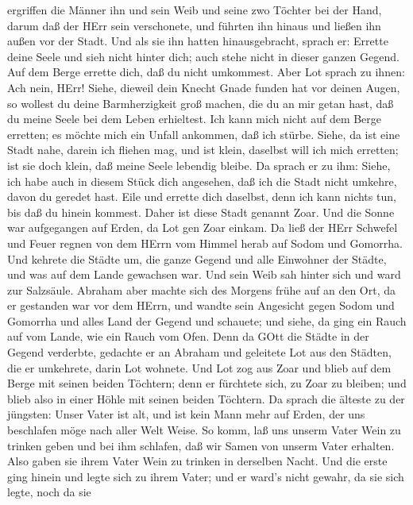 ergriffen die Männer ihn und sein Weib und seine zwo Töchter bei der
Hand, darum daß der HErr sein verschonete, und führten ihn hinaus und
ließen ihn außen vor der Stadt.  Und als sie ihn hatten
hinausgebracht, sprach er: Errette deine Seele und sieh nicht hinter
dich; auch stehe nicht in dieser ganzen Gegend. Auf dem Berge errette
dich, daß du nicht umkommest.  Aber Lot sprach zu ihnen:
Ach nein, HErr!  Siehe, dieweil dein Knecht Gnade funden
hat vor deinen Augen, so wollest du deine Barmherzigkeit groß machen,
die du an mir getan hast, daß du meine Seele bei dem Leben erhieltest.
Ich kann mich nicht auf dem Berge erretten; es möchte mich ein Unfall
ankommen, daß ich stürbe.  Siehe, da ist eine Stadt nahe,
darein ich fliehen mag, und ist klein, daselbst will ich mich erretten;
ist sie doch klein, daß meine Seele lebendig bleibe.  Da
sprach er zu ihm: Siehe, ich habe auch in diesem Stück dich angesehen,
daß ich die Stadt nicht umkehre, davon du geredet hast. 
Eile und errette dich daselbst, denn ich kann nichts tun, bis daß du
hinein kommest. Daher ist diese Stadt genannt Zoar.  Und
die Sonne war aufgegangen auf Erden, da Lot gen Zoar einkam.
 Da ließ der HErr Schwefel und Feuer regnen von dem HErrn
vom Himmel herab auf Sodom und Gomorrha.  Und kehrete die
Städte um, die ganze Gegend und alle Einwohner der Städte, und was auf
dem Lande gewachsen war.  Und sein Weib sah hinter sich und
ward zur Salzsäule.  Abraham aber machte sich des Morgens
frühe auf an den Ort, da er gestanden war vor dem HErrn, 
und wandte sein Angesicht gegen Sodom und Gomorrha und alles Land der
Gegend und schauete; und siehe, da ging ein Rauch auf vom Lande, wie ein
Rauch vom Ofen.  Denn da GOtt die Städte in der Gegend
verderbte, gedachte er an Abraham und geleitete Lot aus den Städten, die
er umkehrete, darin Lot wohnete.  Und Lot zog aus Zoar und
blieb auf dem Berge mit seinen beiden Töchtern; denn er fürchtete sich,
zu Zoar zu bleiben; und blieb also in einer Höhle mit seinen beiden
Töchtern.  Da sprach die älteste zu der jüngsten: Unser
Vater ist alt, und ist kein Mann mehr auf Erden, der uns beschlafen möge
nach aller Welt Weise.  So komm, laß uns unserm Vater Wein
zu trinken geben und bei ihm schlafen, daß wir Samen von unserm Vater
erhalten.  Also gaben sie ihrem Vater Wein zu trinken in
derselben Nacht. Und die erste ging hinein und legte sich zu ihrem
Vater; und er ward's nicht gewahr, da sie sich legte, noch da sie

